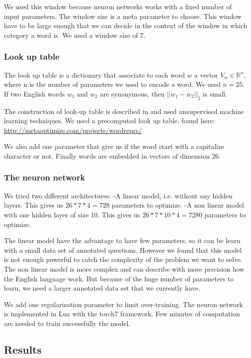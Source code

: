 We used this window because neuron networks works with a fixed number of input parameters. 
The window size is a meta parameter to choose. This window have to be large enough that we can decide in the context of the window in which category a word is. We used a window size of 7.

\subsubsection{Look up table}

The look up table is a dictionary that associate to each word $w$ a vector $V_w \in \mathbb{R}^n$, where n is the number of parameters we used to encode a word. We used $n=25$.
If two English words $w_1$ and $w_2$ are synonymous, then $||w_1-w_2||_2$ is small.

The construction of look-up table is described in \cite{collobert} and used unsupervised machine learning techniques.
We used a precomputed look up table, found here: \url{http://metaoptimize.com/projects/wordreprs/}

We also add one parameter that give us if the word start with a capitalize character or not. Finally words are embedded in vectors of dimension 26. 

\subsubsection{The neuron network}

We tried two different architectures:
-A linear model, i.e. without any hidden layers. This gives us $26*7*4 = 728$ parameters to optimize. 
-A non linear model with one hidden layer of size 10. This gives us $26*7*10*4 = 7280$ parameters to optimize.

The linear model have the advantage to have few parameters, so it can be learn with a small data set of annotated questions. However we found that this model is not enough powerful to catch the complexity of the problem we want to solve.
The non linear model is more complex and can describe with more precision how the English language work. But because of the huge number of parameters to learn, we need a larger annotated data set that we currently have.

We add one regularization parameter to limit over-training.
The neuron network is implemented in Lua with the torch7 framework.
Few minutes of computation are needed to train successfully the model.

\subsection{Results}

